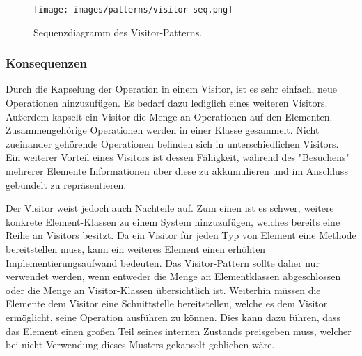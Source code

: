 \begin{figure}[htb]
	\centering
	\texttt{[image: images/patterns/visitor-seq.png]}
	\caption{Sequenzdiagramm des Visitor-Patterns. \cite{skobeleva_visitor_2023}}
	\label{fig:visitor-seq}
\end{figure}

\subsubsection*{Konsequenzen}
Durch die Kapselung der Operation in einem Visitor, ist es sehr einfach, neue Operationen hinzuzufügen. Es bedarf dazu lediglich eines weiteren Visitors. Außerdem kapselt ein Visitor die Menge an Operationen auf den Elementen. Zusammengehörige Operationen werden in einer Klasse gesammelt. Nicht zueinander gehörende Operationen befinden sich in unterschiedlichen Visitors. Ein weiterer Vorteil eines Visitors ist dessen Fähigkeit, während des "Besuchens" mehrerer Elemente Informationen über diese zu akkumulieren und im Anschluss gebündelt zu repräsentieren.

Der Visitor weist jedoch auch Nachteile auf. Zum einen ist es schwer, weitere konkrete Element-Klassen zu einem System hinzuzufügen, welches bereits eine Reihe an Visitors besitzt. Da ein Visitor für jeden Typ von Element eine Methode bereitstellen muss, kann ein weiteres Element einen erhöhten Implementierungsaufwand bedeuten. Das Visitor-Pattern sollte daher nur verwendet werden, wenn entweder die Menge an Elementklassen abgeschlossen oder die Menge an Visitor-Klassen übersichtlich ist. Weiterhin müssen die Elemente dem Visitor eine Schnittstelle bereitstellen, welche es dem Visitor ermöglicht, seine Operation ausführen zu können. Dies kann dazu führen, dass das Element einen großen Teil seines internen Zustands preisgeben muss, welcher bei nicht-Verwendung dieses Musters gekapselt geblieben wäre. \cite{gamma_design_1995}